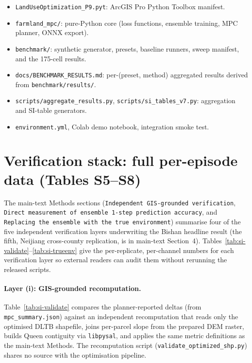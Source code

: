 \documentclass[11pt]{article}
\begin{document}
\begin{itemize}
\item \texttt{LandUseOptimization\_P9.pyt}: ArcGIS Pro Python Toolbox manifest.
\item \texttt{farmland\_mpc/}: pure-Python core (loss functions, ensemble training, MPC planner, ONNX export).
\item \texttt{benchmark/}: synthetic generator, presets, baseline runners, sweep manifest, and the 175-cell results.
\item \texttt{docs/BENCHMARK\_RESULTS.md}: per-(preset, method) aggregated results derived from \texttt{benchmark/results/}.
\item \texttt{scripts/aggregate\_results.py}, \texttt{scripts/si\_tables\_v7.py}: aggregation and SI-table generators.
\item \texttt{environment.yml}, Colab demo notebook, integration smoke test.
\end{itemize}

\section{Verification stack: full per-episode data (Tables S5--S8)}\label{si:s5-verification}

The main-text Methods sections (\texttt{Independent GIS-grounded verification}, \texttt{Direct measurement of ensemble 1-step prediction accuracy}, and \texttt{Replacing the ensemble with the true environment}) summarise four of the five independent verification layers underwriting the Bishan headline result (the fifth, Neijiang cross-county replication, is in main-text Section~4). Tables~\ref{tab:si-validate}--\ref{tab:si-trueenv} give the per-replicate, per-channel numbers for each verification layer so external readers can audit them without rerunning the released scripts.

\paragraph{Layer (i): GIS-grounded recomputation.} Table~\ref{tab:si-validate} compares the planner-reported deltas (from \texttt{mpc\_summary.json}) against an independent recomputation that reads only the optimised DLTB shapefile, joins per-parcel slope from the prepared DEM raster, builds Queen contiguity via \texttt{libpysal}, and applies the same metric definitions as the main-text Methods. The recomputation script (\texttt{validate\_optimized\_shp.py}) shares no source with the optimisation pipeline.
\end{document}
